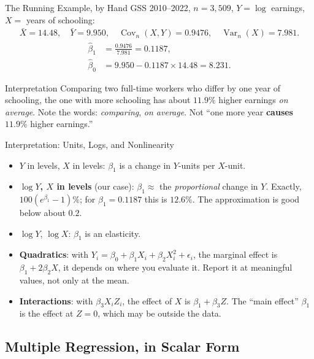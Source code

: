 \documentclass[aspectratio=169,11pt,xcolor=dvipsnames]{beamer}
\DeclareMathOperator{\Cov}{Cov}
\DeclareMathOperator{\Var}{Var}
\begin{document}
\begin{frame}{The Running Example, by Hand}
GSS 2010--2022, $n = 3{,}509$, $Y = \log$ earnings, $X = $ years of schooling:
\begin{align*}
  \bar X = 14.48,\quad \bar Y = 9.950, \quad
  \Cov_n(X,Y) = 0.9476, \quad \Var_n(X) = 7.981 .
\end{align*}
\pause
\begin{align*}
  \hat\beta_1 &= \frac{0.9476}{7.981} = 0.1187 , \\
  \hat\beta_0 &= 9.950 - 0.1187 \times 14.48 = 8.231 .
\end{align*}
\vskip4pt
\begin{block}{Interpretation}
Comparing two full-time workers who differ by one year of schooling, the one with
more schooling has about $11.9\%$ higher earnings \emph{on average}.
\vskip3pt
Note the words: \emph{comparing}, \emph{on average}. Not ``one more year
\textbf{causes} $11.9\%$ higher earnings.''
\end{block}
\end{frame}

\begin{frame}{Interpretation: Units, Logs, and Nonlinearity}
\begin{itemize}\itemsep4pt
  \item $Y$ in levels, $X$ in levels: $\beta_1$ is a change in $Y$-units per
        $X$-unit.
  \item \textbf{$\log Y$, $X$ in levels} (our case): $\beta_1 \approx$ the
        \emph{proportional} change in $Y$. Exactly, $100(e^{\beta_1}-1)\%$; for
        $\beta_1 = 0.1187$ this is $12.6\%$. The approximation is good below
        about $0.2$.
  \item $\log Y$, $\log X$: $\beta_1$ is an elasticity.
  \item \textbf{Quadratics}: with $Y_i = \beta_0 + \beta_1 X_i + \beta_2 X_i^2 +
        \epsilon_i$, the marginal effect is $\beta_1 + 2\beta_2 X$, it depends
        on where you evaluate it. Report it at meaningful values, not only at the
        mean.
  \item \textbf{Interactions}: with $\beta_3 X_i Z_i$, the effect of $X$ is
        $\beta_1 + \beta_3 Z$. The ``main effect'' $\beta_1$ is the effect at
        $Z = 0$, which may be outside the data.
\end{itemize}
\end{frame}

\subsection*{Multiple Regression, in Scalar Form}
\begin{frame}\subsectionpage\end{frame}
\end{document}
